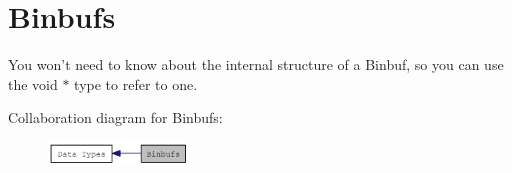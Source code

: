 \hypertarget{group__binbuf}{
\section{Binbufs}
\label{group__binbuf}
}


You won’t need to know about the internal structure of a Binbuf, so you can use the void $\ast$ type to refer to one.  


Collaboration diagram for Binbufs:\nopagebreak
\begin{figure}[H]
\begin{center}
\leavevmode
\includegraphics[width=106pt]{group__binbuf}
\end{center}
\end{figure}
